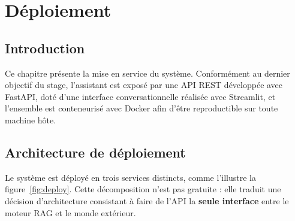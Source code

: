 \chapter{Déploiement}
\label{ch:deploiement}

\section{Introduction}

Ce chapitre présente la mise en service du système. Conformément au dernier
objectif du stage, l'assistant est exposé par une API REST développée avec
FastAPI, doté d'une interface conversationnelle réalisée avec Streamlit, et
l'ensemble est conteneurisé avec Docker afin d'être reproductible sur toute
machine hôte.

\section{Architecture de déploiement}

Le système est déployé en trois services distincts, comme l'illustre la
figure~\ref{fig:deploy}. Cette décomposition n'est pas gratuite : elle traduit
une décision d'architecture consistant à faire de l'API la \textbf{seule
interface} entre le moteur RAG et le monde extérieur.

